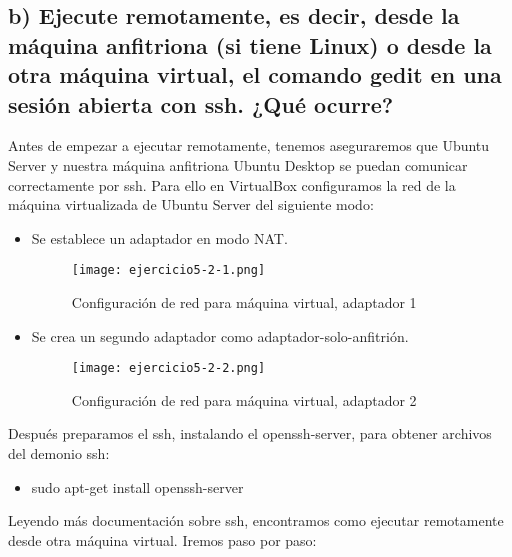 	
	\subsection{b) Ejecute remotamente, es decir, desde la máquina anfitriona (si tiene Linux) o desde la otra máquina virtual, el comando gedit en una sesión abierta con ssh. ¿Qué ocurre?}
	
	Antes de empezar a ejecutar remotamente, tenemos aseguraremos que Ubuntu Server y nuestra máquina anfitriona Ubuntu Desktop se puedan comunicar correctamente por ssh. Para ello en VirtualBox configuramos la red de la máquina virtualizada de Ubuntu Server del siguiente modo:
	
	\begin{itemize}
		\item Se establece un adaptador en modo NAT.
		\begin{figure}[H] 
			\centering
			\texttt{[image: ejercicio5-2-1.png]} 
			\label{figura37} 
			
			\caption{Configuración de red para máquina virtual, adaptador 1}
		\end{figure}
		\item Se crea un segundo adaptador como adaptador-solo-anfitrión.
		\begin{figure}[H] 
			\centering
			\texttt{[image: ejercicio5-2-2.png]} 
			\label{figura38} 
			
			\caption{Configuración de red para máquina virtual, adaptador 2}
		\end{figure}
	\end{itemize}
	
	Después preparamos el ssh, instalando el openssh-server, para obtener archivos del demonio ssh\cite{ejercicio5-4}:
	
	\begin{itemize}
		\item sudo apt-get install openssh-server
	\end{itemize}  
	
	Leyendo más documentación sobre ssh, encontramos como ejecutar remotamente desde otra máquina virtual\cite{ejercicio5-5,ejercicio5-6}. Iremos paso por paso:
	
